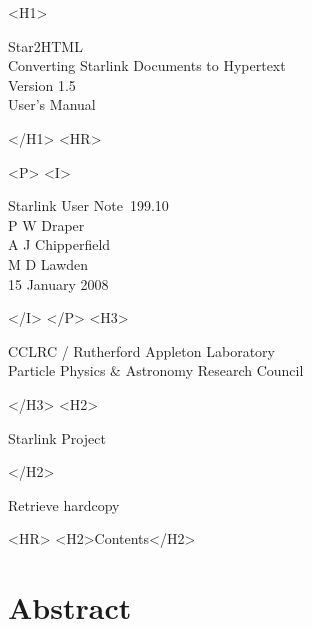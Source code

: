 \documentclass[twoside,11pt]{article}
\newcommand{\stardoccategory}  {Starlink User Note}
\newcommand{\stardocsource}    {sun\stardocnumber}
\newcommand{\stardocnumber}    {199.10}
\newcommand{\stardocauthors}   {P W Draper\\
                                A J Chipperfield\\
                                M D Lawden}
\newcommand{\stardocdate}      {15 January 2008}
\newcommand{\stardoctitle}     {Star2HTML\\[1ex]
                                Converting Starlink Documents to Hypertext}
\newcommand{\stardocversion}   {Version 1.5}
\newcommand{\stardocmanual}    {User's Manual}
\newcommand{\htmladdnormallink}[2]{#1}
\newcommand{\htmladdimg}[1]{}
\newcommand{\htmlref}[2]{#1}
\newcommand{\htmladdtonavigation}[1]{}
\newcommand{\xlabel}[1]{}
\renewcommand{\_}{\texttt{\symbol{95}}}
\begin{document}
\begin{htmlonly}
   \xlabel{}
   \begin{rawhtml} <H1> \end{rawhtml}
      \stardoctitle\\
      \stardocversion\\
      \stardocmanual
   \begin{rawhtml} </H1> <HR> \end{rawhtml}


   \begin{rawhtml} <P> <I> \end{rawhtml}
   \stardoccategory\ \stardocnumber \\
   \stardocauthors \\
   \stardocdate
   \begin{rawhtml} </I> </P> <H3> \end{rawhtml}
      \htmladdnormallink{CCLRC / Rutherford Appleton Laboratory}
                        {http://www.cclrc.ac.uk} \\
      \htmladdnormallink{Particle Physics \& Astronomy Research Council}
                        {http://www.pparc.ac.uk} \\
   \begin{rawhtml} </H3> <H2> \end{rawhtml}
      \htmladdnormallink{Starlink Project}{http://www.starlink.rl.ac.uk/}
   \begin{rawhtml} </H2> \end{rawhtml}
   \htmladdnormallink{\htmladdimg{source.gif} Retrieve hardcopy}
      {http://www.starlink.rl.ac.uk/cgi-bin/hcserver?\stardocsource}\\

  \label{stardoccontents}
  \begin{rawhtml}
    <HR>
    <H2>Contents</H2>
  \end{rawhtml}
  \htmladdtonavigation{\htmlref{\htmladdimg{contents_motif.gif}}
        {stardoccontents}}

  \section{\xlabel{abstract}Abstract}
\end{htmlonly}
\end{document}
